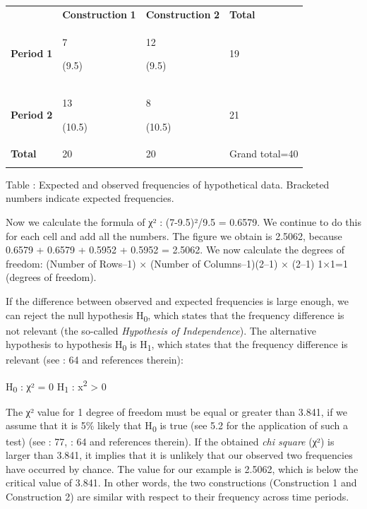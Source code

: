 \documentclass[output=paper]{langscibook}
\begin{document}
\begin{tabularx}{\textwidth}{XXXX}

\lsptoprule
\multicolumn{1}{c}{} & \textbf{Construction} \textbf{1} & \textbf{Construction} \textbf{2} & \textbf{Total}\\
\textbf{Period} \textbf{1} & { 7}

 (9.5) & { 12}

 (9.5) & 19\\
\textbf{Period} \textbf{2} & { 13}

 (10.5) & { 8}

 (10.5) & 21\\
\textbf{Total} & 20 & 20 & Grand total=40\\
\lspbottomrule
\end{tabularx}
\begin{stylecaption}
\textmd{Table : Expected and observed frequencies of hypothetical data. Bracketed numbers indicate expected frequencies.}
\end{stylecaption}

Now we calculate the formula of χ² : (7-9.5)²/9.5 = 0.6579. We continue to do this for each cell and add all the numbers. The figure we obtain is 2.5062, because 0.6579 + 0.6579 + 0.5952 + 0.5952 = 2.5062. We now calculate the degrees of freedom: (Number of Rows–1) × (Number of Columns–1)(2–1) × (2–1) 1×1=1 (degrees of freedom).

  If the difference between observed and expected frequencies is large enough, we can reject the null hypothesis H\textsubscript{0}, which states that the frequency difference is not relevant (the so-called \textit{Hypothesis of Independence}). The alternative hypothesis to hypothesis H\textsubscript{0} is H\textsubscript{1}, which states that the frequency difference is relevant (see \citealt{Author2018}: 64 and references therein): 

  H\textsubscript{0} : χ² = 0 H\textsubscript{1} : x\textsuperscript{2} > 0

  The χ² value for 1 degree of freedom must be equal or greater than 3.841, if we assume that it is 5\% likely that H\textsubscript{0} is true (see 5.2 for the application of such a test) (see \citealt{Baayen2008}: 77, \citealt{Author2018}: 64 and references therein). If the obtained \textit{chi square} (χ²) is larger than 3.841, it implies that it is unlikely that our observed two frequencies have occurred by chance. The value for our example is 2.5062, which is below the critical value of 3.841. In other words, the two constructions (Construction 1 and Construction 2) are similar with respect to their frequency across time periods. 
\end{document}
